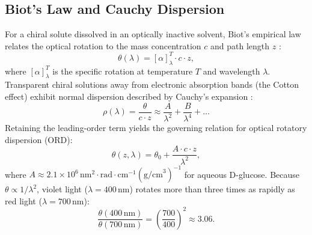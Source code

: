 \documentclass[twocolumn,10pt,a4paper]{article}
\begin{document}
\subsection{Biot's Law and Cauchy Dispersion}
For a chiral solute dissolved in an optically inactive solvent, Biot's empirical law relates the optical rotation to the mass concentration $c$ and path length $z$ \cite{biot1815}:
\begin{equation}
  \theta(\lambda) = [\alpha]_\lambda^T \cdot c \cdot z,
  \label{eq:biot_law}
\end{equation}
where $[\alpha]_\lambda^T$ is the specific rotation at temperature $T$ and wavelength $\lambda$. Transparent chiral solutions away from electronic absorption bands (the Cotton effect) exhibit normal dispersion described by Cauchy's expansion \cite{cauchy1836, djerassi1960}:
\begin{equation}
  \rho(\lambda) = \frac{\theta}{c \cdot z} \approx \frac{A}{\lambda^2} + \frac{B}{\lambda^4} + \dots
  \label{eq:cauchy_series}
\end{equation}
Retaining the leading-order term yields the governing relation for optical rotatory dispersion (ORD):
\begin{equation}
  \theta(z, \lambda) = \theta_0 + \frac{A \cdot c \cdot z}{\lambda^2},
  \label{eq:cauchy_rot}
\end{equation}
where $A \approx 2.1 \times 10^6\,\text{nm}^2\cdot\text{rad}\cdot\text{cm}^{-1}(\text{g/cm}^3)^{-1}$ for aqueous D-glucose. Because $\theta \propto 1/\lambda^2$, violet light ($\lambda = 400\,\text{nm}$) rotates more than three times as rapidly as red light ($\lambda = 700\,\text{nm}$):
\begin{equation}
  \frac{\theta(400\,\text{nm})}{\theta(700\,\text{nm})} = \left(\frac{700}{400}\right)^2 \approx 3.06.
\end{equation}
\end{document}
